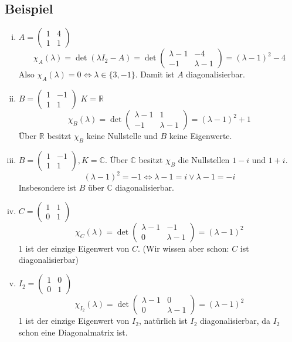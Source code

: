 \subsection{Beispiel} %
\label{sub:beispiel}
\begin{enumerate}[(i)]
	\item $A = \begin{pmatrix}
		1 & 4 \\
		1 & 1
	\end{pmatrix}$
	\[
		\chi_A (\lambda )= \det(\lambda I_2 -A) = \det \begin{pmatrix}
			\lambda -1 & -4 \\
			-1 & \lambda -1
		\end{pmatrix} = (\lambda -1)^2 -4
	\]
	Also $\chi_A(\lambda)= 0 \Leftrightarrow \lambda \in \{3, -1 \}$. Damit ist $A$ diagonalisierbar.
	\item $B = \begin{pmatrix}
		1 & -1 \\
		1 & 1
	\end{pmatrix}$ $K = \mathds{R}$
	\[
		\chi_B(\lambda ) = \det \begin{pmatrix}
			\lambda -1 & 1 \\
			-1 & \lambda -1
		\end{pmatrix} = (\lambda -1)^2 +1
	\]
	Über $\mathds{R}$ besitzt $\chi_B$ keine Nullstelle und $B$ keine Eigenwerte.
	\item $B= \begin{pmatrix}
		1 & -1 \\
		1 & 1
	\end{pmatrix}, K = \mathds{C}$. Über $\mathds{C}$ besitzt $\chi_B$ die Nullstellen $1-i$ und $1+i$.
	\[
		(\lambda -1)^2 = -1 \Leftrightarrow \lambda -1 = i \vee \lambda -1 = -i
	\]
	Insbesondere ist $B$ über $\mathds{C}$ diagonalisierbar.
	\item $C= \begin{pmatrix}
		1 & 1 \\
		0 & 1
	\end{pmatrix} $
	\[
		\chi_C(\lambda ) = \det \begin{pmatrix}
			\lambda -1 & -1 \\
			0 & \lambda -1
		\end{pmatrix} = (\lambda -1)^2
	\]
	1 ist der einzige Eigenwert von $C$. (Wir wissen aber schon: $C$ ist  diagonalisierbar)
	\item $I_2= \begin{pmatrix}
		1 & 0 \\
		0 & 1
	\end{pmatrix}$
	\[
		\chi_{I_2}(\lambda ) = \det \begin{pmatrix}
			\lambda -1 & 0 \\
			0 & \lambda -1
		\end{pmatrix} = (\lambda -1)^2
	\]
	1 ist der einzige Eigenwert von $I_2$, natürlich ist $I_2$ diagonalisierbar, da $I_2$ schon eine Diagonalmatrix ist.
\end{enumerate}

